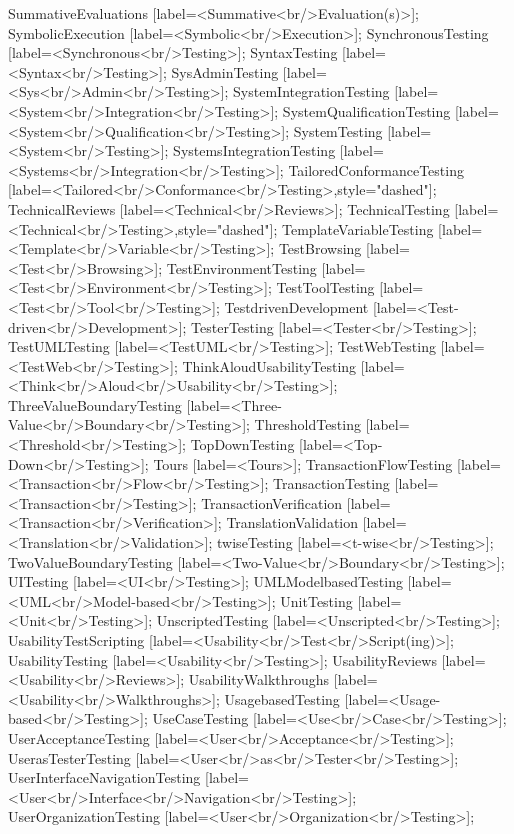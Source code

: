\documentclass{article}
\begin{document}
{SummativeEvaluations [label=<Summative<br/>Evaluation(s)>];
SymbolicExecution [label=<Symbolic<br/>Execution>];
SynchronousTesting [label=<Synchronous<br/>Testing>];
SyntaxTesting [label=<Syntax<br/>Testing>];
SysAdminTesting [label=<Sys<br/>Admin<br/>Testing>];
SystemIntegrationTesting [label=<System<br/>Integration<br/>Testing>];
SystemQualificationTesting [label=<System<br/>Qualification<br/>Testing>];
SystemTesting [label=<System<br/>Testing>];
SystemsIntegrationTesting [label=<Systems<br/>Integration<br/>Testing>];
TailoredConformanceTesting [label=<Tailored<br/>Conformance<br/>Testing>,style="dashed"];
TechnicalReviews [label=<Technical<br/>Reviews>];
TechnicalTesting [label=<Technical<br/>Testing>,style="dashed"];
TemplateVariableTesting [label=<Template<br/>Variable<br/>Testing>];
TestBrowsing [label=<Test<br/>Browsing>];
TestEnvironmentTesting [label=<Test<br/>Environment<br/>Testing>];
TestToolTesting [label=<Test<br/>Tool<br/>Testing>];
TestdrivenDevelopment [label=<Test-driven<br/>Development>];
TesterTesting [label=<Tester<br/>Testing>];
TestUMLTesting [label=<TestUML<br/>Testing>];
TestWebTesting [label=<TestWeb<br/>Testing>];
ThinkAloudUsabilityTesting [label=<Think<br/>Aloud<br/>Usability<br/>Testing>];
ThreeValueBoundaryTesting [label=<Three-Value<br/>Boundary<br/>Testing>];
ThresholdTesting [label=<Threshold<br/>Testing>];
TopDownTesting [label=<Top-Down<br/>Testing>];
Tours [label=<Tours>];
TransactionFlowTesting [label=<Transaction<br/>Flow<br/>Testing>];
TransactionTesting [label=<Transaction<br/>Testing>];
TransactionVerification [label=<Transaction<br/>Verification>];
TranslationValidation [label=<Translation<br/>Validation>];
twiseTesting [label=<t-wise<br/>Testing>];
TwoValueBoundaryTesting [label=<Two-Value<br/>Boundary<br/>Testing>];
UITesting [label=<UI<br/>Testing>];
UMLModelbasedTesting [label=<UML<br/>Model-based<br/>Testing>];
UnitTesting [label=<Unit<br/>Testing>];
UnscriptedTesting [label=<Unscripted<br/>Testing>];
UsabilityTestScripting [label=<Usability<br/>Test<br/>Script(ing)>];
UsabilityTesting [label=<Usability<br/>Testing>];
UsabilityReviews [label=<Usability<br/>Reviews>];
UsabilityWalkthroughs [label=<Usability<br/>Walkthroughs>];
UsagebasedTesting [label=<Usage-based<br/>Testing>];
UseCaseTesting [label=<Use<br/>Case<br/>Testing>];
UserAcceptanceTesting [label=<User<br/>Acceptance<br/>Testing>];
UserasTesterTesting [label=<User<br/>as<br/>Tester<br/>Testing>];
UserInterfaceNavigationTesting [label=<User<br/>Interface<br/>Navigation<br/>Testing>];
UserOrganizationTesting [label=<User<br/>Organization<br/>Testing>];
}
\end{document}
